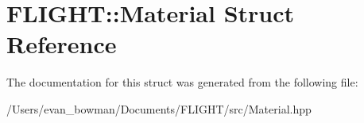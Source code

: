 \hypertarget{struct_f_l_i_g_h_t_1_1_material}{}\section{F\+L\+I\+G\+HT\+:\+:Material Struct Reference}
\label{struct_f_l_i_g_h_t_1_1_material}


The documentation for this struct was generated from the following file\+:\begin{DoxyCompactItemize}
\item 
/\+Users/evan\+\_\+bowman/\+Documents/\+F\+L\+I\+G\+H\+T/src/Material.\+hpp\end{DoxyCompactItemize}
